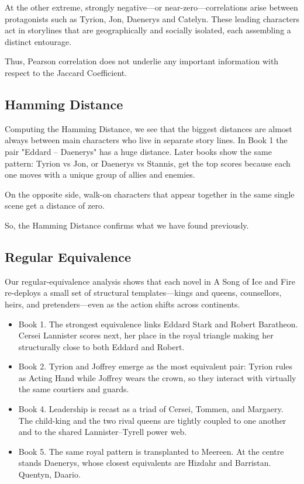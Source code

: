 \documentclass[12pt, a4paper]{article}
\begin{document}
At the other extreme, strongly negative—or near-zero—correlations arise
between protagonists such as Tyrion, Jon, Daenerys and Catelyn.
These leading characters act in storylines that are geographically and
socially isolated, each assembling a distinct entourage.

Thus, Pearson correlation does not underlie any important information with respect to the Jaccard Coefficient.

\subsection*{Hamming Distance}

Computing the Hamming Distance, we see that the biggest distances are almost always between main characters who live in separate story lines.
In Book 1 the pair "Eddard – Daenerys" has a huge distance.
Later books show the same pattern: Tyrion vs Jon, or Daenerys vs Stannis, get the top scores because each one moves with a unique group of allies and enemies.

On the opposite side, walk-on characters that appear together in the same single scene get a distance of zero.


So, the Hamming Distance confirms what we have found previously.

 
\subsection*{Regular Equivalence}

Our regular-equivalence analysis shows that each novel in A Song of Ice and Fire re-deploys a small set of structural templates—kings and queens, counsellors, heirs, and pretenders—even as the action shifts across continents.

 \begin{itemize}
     \item Book 1. The strongest equivalence links Eddard Stark and Robert Baratheon. Cersei Lannister scores next, her place in the royal triangle making her structurally close to both Eddard and Robert.
     \item Book 2. Tyrion and Joffrey emerge as the most equivalent pair: Tyrion rules as Acting Hand while Joffrey wears the crown, so they interact with virtually the same courtiers and guards.
     \item Book 4. Leadership is recast as a triad of Cersei, Tommen, and Margaery. The child-king and the two rival queens are tightly coupled to one another and to the shared Lannister–Tyrell power web.
     \item Book 5. The same royal pattern is transplanted to Meereen. At the centre stands Daenerys, whose closest equivalents are Hizdahr and Barristan. Quentyn, Daario.
 \end{itemize}
\end{document}

